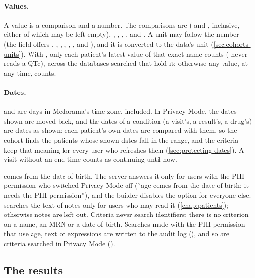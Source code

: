 \paragraph{Values.} A value is a comparison and a number. The comparisons are 
( and , inclusive, either of which may be left empty), \ui{>}, \ui{$\geq$},
\ui{<}, \ui{$\leq$}, \ui{=} and \ui{$\neq$}. A unit may follow the number (the field offers
, , , , , \code{\textdegree}, 
and ), and it is converted to the data's unit (\cref{sec:cohorts-units}). With
, only each patient's latest value of that exact name counts (
never reads a QTc), across the databases searched that hold it; otherwise any value, at any
time, counts.

\paragraph{Dates.}  and  are days in Medorama's time zone,  included.
In Privacy Mode, the dates shown are moved back, and the dates of a condition (a visit's, a
result's, a drug's) are dates as shown: each patient's own dates are compared with them, so the
cohort finds the patients whose shown dates fall in the range, and the criteria keep that meaning
for every user who refreshes them (\cref{sec:protecting-dates}). A visit without an end time counts
as continuing until now.

\begin{phibox}
 comes from the date of birth. The server answers it only for users with the PHI
permission who switched Privacy Mode off (``age comes from the date of birth: it needs the PHI
permission''), and the builder disables the  option for everyone else.  searches the text of notes only for users who may read it (\cref{chap:patients});
otherwise notes are left out. Criteria never search identifiers: there is no criterion on a
name, an MRN or a date of birth. Searches made with the PHI permission that use age, text or
expressions are written to the audit log (), and so are criteria searched in
Privacy Mode ().
\end{phibox}

\subsection{The results}
\label{sec:cohorts-results}

